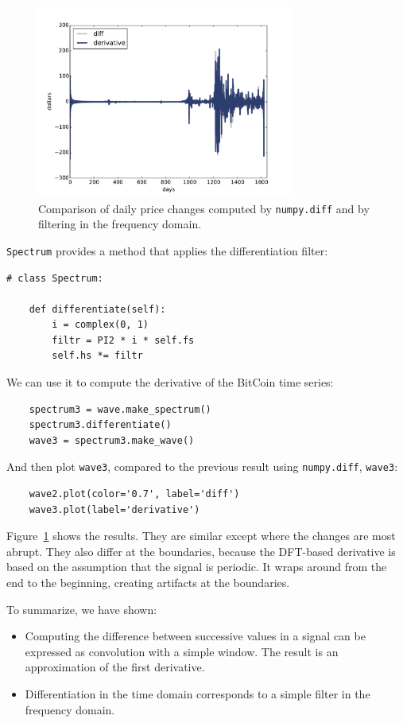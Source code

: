 \documentclass[12pt]{book}
\begin{document}
\begin{figure}
\centerline{\includegraphics[height=2.5in]{figs/systems4.pdf}}
\caption{Comparison of daily price changes computed by
{\tt numpy.diff} and by filtering in the frequency domain.}
\label{fig.systems4}
\end{figure}

{\tt Spectrum} provides a method that applies the differentiation
filter:

\begin{verbatim}
# class Spectrum:

    def differentiate(self):
        i = complex(0, 1)
        filtr = PI2 * i * self.fs
        self.hs *= filtr
\end{verbatim}

We can use it to compute the derivative of the BitCoin time series:

\begin{verbatim}
    spectrum3 = wave.make_spectrum()
    spectrum3.differentiate()
    wave3 = spectrum3.make_wave()
\end{verbatim}

And then plot {\tt wave3}, compared to the previous result
using {\tt numpy.diff}, {\tt wave3}:

\begin{verbatim}
    wave2.plot(color='0.7', label='diff')
    wave3.plot(label='derivative')
\end{verbatim}

Figure~\ref{fig.systems4} shows the results.  They are similar except
where the changes are most abrupt.  They also differ at the
boundaries, because the DFT-based derivative is based on the
assumption that the signal is periodic.  It wraps around from the end
to the beginning, creating artifacts at the boundaries.

To summarize, we have shown:

\begin{itemize} 

\item Computing the difference between successive values in a signal
  can be expressed as convolution with a simple window.  The result is
  an approximation of the first derivative.

\item Differentiation in the time domain corresponds to a simple
  filter in the frequency domain.

\end{itemize}
\end{document}

